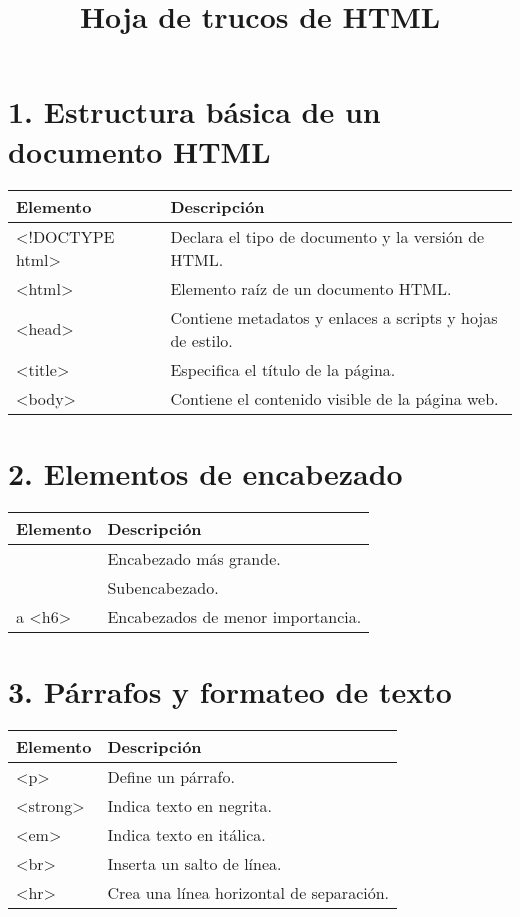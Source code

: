 \documentclass{article}
\title{Hoja de trucos de HTML}
\author{}
\date{}
\begin{document}
\maketitle

\section*{1. Estructura básica de un documento HTML}
\begin{tabular}{>{\ttfamily}l p{10cm}}
\textnormal{Elemento} & Descripción \\
\hline
<!DOCTYPE html> & Declara el tipo de documento y la versión de HTML. \\
<html> & Elemento raíz de un documento HTML. \\
<head> & Contiene metadatos y enlaces a scripts y hojas de estilo. \\
<title> & Especifica el título de la página. \\
<body> & Contiene el contenido visible de la página web. \\
\end{tabular}

\section*{2. Elementos de encabezado}
\begin{tabular}{>{\ttfamily}l p{10cm}}
\textnormal{Elemento} & Descripción \\
\hline
<h1> & Encabezado más grande. \\
<h2> & Subencabezado. \\
<h3> a <h6> & Encabezados de menor importancia. \\
\end{tabular}

\section*{3. Párrafos y formateo de texto}
\begin{tabular}{>{\ttfamily}l p{10cm}}
\textnormal{Elemento} & Descripción \\
\hline
<p> & Define un párrafo. \\
<strong> & Indica texto en negrita. \\
<em> & Indica texto en itálica. \\
<br> & Inserta un salto de línea. \\
<hr> & Crea una línea horizontal de separación. \\
\end{tabular}
\end{document}
